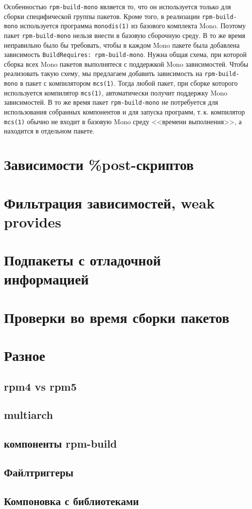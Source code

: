 \documentclass[russian,a4paper,12pt,titlepage]{article}
\begin{document}
Особенностью \verb|rpm-build-mono| является то, что он используется только для сборки специфической группы
пакетов.  Кроме того, в реализации \verb|rpm-build-mono| используется программа \verb|monodis(1)| из базового
комплекта Mono.  Поэтому пакет \verb|rpm-build-mono| нельзя внести в базовую сборочную среду.  В то же время
неправильно было бы требовать, чтобы в каждом Mono пакете была добавлена зависимость \texttt{BuildRequires: rpm-build-mono}.
Нужна общая схема, при которой сборка всех Mono пакетов выполнятеся с поддержкой Mono зависимостей.
Чтобы реализовать такую схему, мы предлагаем добавить зависимость на \verb|rpm-build-mono| в пакет
с компилятором \verb|mcs(1)|.  Тогда любой пакет, при сборке которого используется компилятор \verb|mcs(1)|,
автоматически получит поддержку Mono зависимостей.  В то же время пакет \verb|rpm-build-mono| не потребуется
для использования собранных компонентов и для запуска программ, т.\,к. компилятор \verb|mcs(1)| обычно
не входит в базовую Mono среду <<времени выполнения>>, а находится в отдельном пакете.

\section{Зависимости \%post-скриптов}

\label{post-script-deps}

\section{Фильтрация зависимостей, weak provides}
\label{filter-deps}

\section{Подпакеты с отладочной информацией}

\label{debuginfo-subpackages}

\section{Проверки во время сборки пакетов}

\label{brp-verify}

\section{Разное}

\subsection{rpm4 vs rpm5}

\subsection{multiarch}

\subsection{компоненты rpm-build}

\subsection{Файлтриггеры}

\subsection{Компоновка с библиотеками}
\label{linkning-with-libraries}
\end{document}

